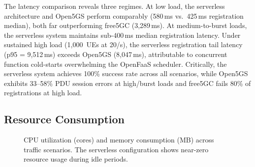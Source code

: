 \documentclass[conference]{IEEEtran}
\begin{document}
The latency comparison reveals three regimes. At low load, the serverless architecture and Open5GS perform comparably (580\,ms vs.\ 425\,ms registration median), both far outperforming free5GC (3,289\,ms). At medium-to-burst loads, the serverless system maintains sub-400\,ms median registration latency. Under sustained high load (1,000~UEs at 20/s), the serverless registration tail latency (p95 = 9,512\,ms) exceeds Open5GS (8,047\,ms), attributable to concurrent function cold-starts overwhelming the OpenFaaS scheduler. Critically, the serverless system achieves 100\% success rate across all scenarios, while Open5GS exhibits 33--58\% PDU session errors at high/burst loads and free5GC fails 80\% of registrations at high load.

\subsection{Resource Consumption}

\begin{figure}[t]
    \centering
    


    \caption{CPU utilization (cores) and memory consumption (MB) across traffic scenarios. The serverless configuration shows near-zero resource usage during idle periods.}
    \label{fig:resources}
\end{figure}
\end{document}
